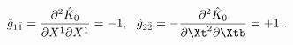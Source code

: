 \begin{equation}
\label{lt}
\hat{g}_{1\bar{1}}=
{\partial^2\hat{K}_0\over \partial X^1\partial \bar{X}^1}=-1,
~~
\hat{g}_{2\bar{2}}=-{\partial^2\hat{K}_0\over \partial \Xt^2\partial \Xtb}
=+1 \ .
\end{equation}

